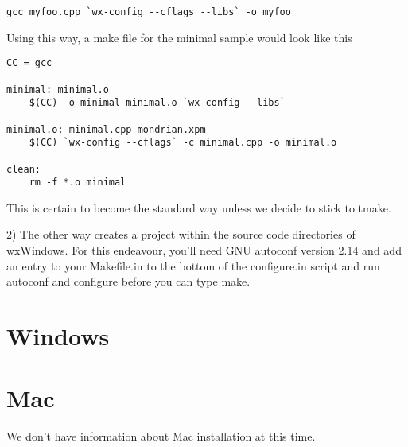 \begin{verbatim}
gcc myfoo.cpp `wx-config --cflags --libs` -o myfoo
\end{verbatim}

Using this way, a make file for the minimal sample would look
like this

\begin{verbatim}
CC = gcc

minimal: minimal.o
    $(CC) -o minimal minimal.o `wx-config --libs` 

minimal.o: minimal.cpp mondrian.xpm
    $(CC) `wx-config --cflags` -c minimal.cpp -o minimal.o

clean: 
	rm -f *.o minimal
\end{verbatim}

This is certain to become the standard way unless we decide
to stick to tmake.

2) The other way creates a project within the source code 
directories of wxWindows. For this endeavour, you'll need
GNU autoconf version 2.14 and add an entry to your Makefile.in
to the bottom of the configure.in script and run autoconf
and configure before you can type make.

\section{Windows}\label{installwindows}


\section{Mac}\label{installmac}

We don't have information about Mac installation at this time.

